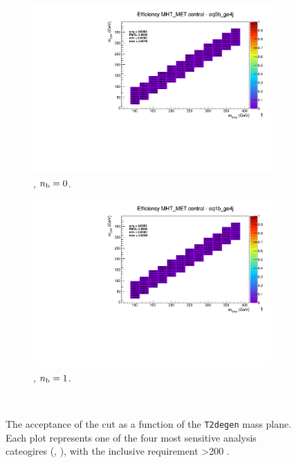 \begin{figure}[h!]
\begin{subfigure}[b]{0.4\textwidth}
    \includegraphics[width=\textwidth, page=5]{Figs/sms/t2degen/v19_2/systs/T2_4body_MHT_MET_eq0b_ge4j.pdf}
    \caption{\njhigh, $n_{\text{b}} = 0$.}
  \end{subfigure}
  \begin{subfigure}[b]{0.4\textwidth}
    \includegraphics[width=\textwidth, page=5]{Figs/sms/t2degen/v19_2/systs/T2_4body_MHT_MET_eq1b_ge4j.pdf}
    \caption{\njhigh, $n_{\text{b}} = 1$.}
  \end{subfigure}\\
  \caption{The acceptance of the \mhtmet cut as a function of the \texttt{T2degen}
  mass plane. Each plot represents one of the four most sensitive 
  analysis cateogires (\nb, \nj), with the inclusive requirement \HT>200 \gev.}
  \label{fig:sms-mhtmet-t2degen}
\end{figure}


